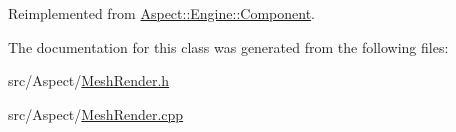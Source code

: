 Reimplemented from \mbox{\hyperlink{class_aspect_1_1_engine_1_1_component}{Aspect\+::\+Engine\+::\+Component}}.



The documentation for this class was generated from the following files\+:\begin{DoxyCompactItemize}
\item 
src/\+Aspect/\mbox{\hyperlink{_mesh_render_8h}{Mesh\+Render.\+h}}\item 
src/\+Aspect/\mbox{\hyperlink{_mesh_render_8cpp}{Mesh\+Render.\+cpp}}\end{DoxyCompactItemize}
